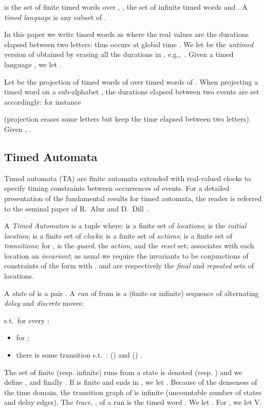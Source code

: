 \documentclass[letterpaper,10pt,conference]{ieeeconf}  \IEEEoverridecommandlockouts                              \overrideIEEEmargins
\def\eg{{e.g.},~}
\def\st{{s.t.}~}
\def\endef{\ifmmode\squareforged\else{\unskip\nobreak\hfil
\penalty50\hskip1em\null\nobreak\hfil
\parfillskip=0pt\finalhyphendemerits=0\endgraf}\fi}
\begin{document}
 is the set of finite timed words over ,
, the set of infinite timed words and
. A \emph{timed
  language} is any subset of . 

In this paper we write timed words as 
where the real values are the durations elapsed between two letters:
thus  occurs at global time . 
We let  be the \emph{untimed} ver\-sion of  ob\-tai\-ned by
erasing all the durations in ,
\eg .
Given a timed language , we
let .

Let  be the projection of timed words of 
over timed words of .  When projecting a timed word 
on a sub-alphabet , the durations elap\-sed
bet\-ween two events are set accordingly: for instance

(projection erases some letters but keep the time elapsed between two
letters).    Given ,
.

\subsection{Timed Automata}
Timed automata (TA) are finite automata extended with real-valued clocks to
specify timing constraints between occurrences of events.  For a
detailed presentation of the fundamental results for timed automata,
the reader is referred to the seminal paper of R.~Alur and
D.~Dill~\cite{AlurDill94}.
\noindent\begin{definition}\label{def-ta} 
  A \emph{Timed Automaton}  is a tuple  
   where:
 is a finite set of  \emph{locations}; 
 is the \emph{initial location};
 is a finite set of \emph{clocks};
 is a finite set of \emph{actions}; 
 is a finite set of \emph{transitions}; for
,  is the \emph{guard},  the \emph{action},
and  the \emph{reset} set;
 associates with each location an
  \emph{invariant}; as usual we require the invariants to be
  conjunctions of constraints of the form  with .
 and  are respectively the
  \emph{final} and \emph{repeated} sets of locations. \endef
\end{definition}
A \emph{state} of  is a pair .
A \emph{run}  of  from  is a (finite or
infinite) sequence of alternating \emph{delay} and \emph{discrete}
moves:

\st for every :
\begin{itemize}
\item  for ;
\item there is some transition 
  \st: ()  and ()
  .
\end{itemize}
The set of finite (resp. infinite) runs from a state  is denoted  (resp. )
and we define ,
  and finally .  If 
is finite and ends in , we let .  Because of
the den\-se\-ness of the time domain, the transition graph of  is
infinite (uncountable number of states and delay edges).
The \emph{trace}, , of a run  is the timed
word .  We let
.  For , we
let \varrho \in V.
\end{document}

